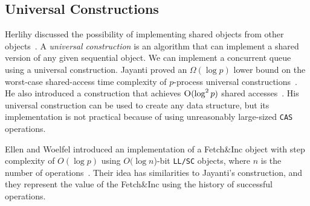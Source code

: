 \documentclass[12pt]{article}
\begin{document}
\subsection{Universal Constructions}
Herlihy discussed the possibility of implementing shared objects from other objects~\cite{10.1145/114005.102808}. A \textit{universal construction} is an algorithm that can implement a shared version of any given sequential object. We can implement a concurrent queue using a universal construction. Jayanti proved an $\Omega(\log p)$ lower bound on the worst-case shared-access time complexity of $p$-process universal constructions~\cite{DBLP:conf/podc/Jayanti98a}. He also introduced a construction that achieves $\textsc{O}(\log^2 p)$ shared accesses~\cite{DBLP:conf/podc/ChandraJT98}. His universal construction can be used to create any data structure, but its implementation is not practical because of using unreasonably large-sized \texttt{CAS} operations.

Ellen and Woelfel introduced an implementation of a Fetch\&Inc object with step complexity of $O(\log p)$ using $O(\log n$)-bit \texttt{LL/SC} objects, where $n$ is the number of operations~\cite{10.1007/978-3-642-41527-2_20}. Their idea has similarities to Jayanti's construction, and they represent the value of the Fetch\&Inc using the history of successful operations. 



\end{document}
